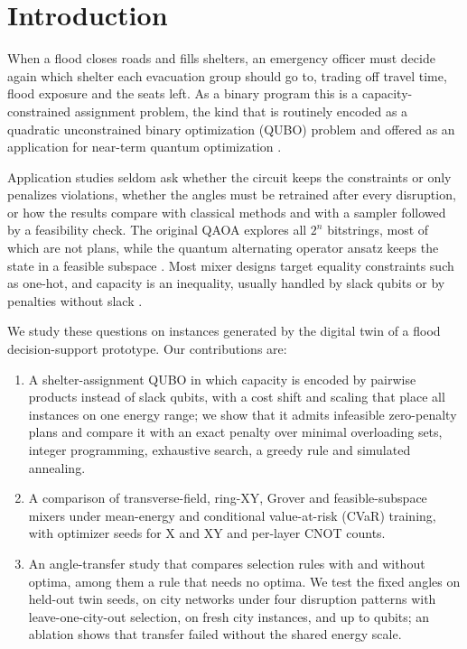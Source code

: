 \documentclass[conference]{IEEEtran}
\begin{document}
\section{Introduction}
When a flood closes roads and fills shelters, an emergency officer must decide again which shelter each evacuation group should go to, trading off travel time, flood exposure and the seats left. As a binary program this is a capacity-constrained assignment problem, the kind that is routinely encoded as a quadratic unconstrained binary optimization (QUBO) problem \cite{Lucas2014,Glover2019} and offered as an application for near-term quantum optimization \cite{Cadelina2024,Abbas2024}.

Application studies \cite{Cadelina2024,Abbas2024} seldom ask whether the circuit keeps the constraints or only penalizes violations, whether the angles must be retrained after every disruption, or how the results compare with classical methods and with a sampler followed by a feasibility check. The original QAOA \cite{Farhi2014} explores all $2^n$ bitstrings, most of which are not plans, while the quantum alternating operator ansatz \cite{Hadfield2019} keeps the state in a feasible subspace \cite{WangZ2020,Fuchs2022,Bartschi2020}. Most mixer designs target equality constraints such as one-hot, and capacity is an inequality, usually handled by slack qubits or by penalties without slack \cite{Montanez2024}.

We study these questions on instances generated by the digital twin of a flood decision-support prototype. Our contributions are:
\begin{enumerate}
\item A shelter-assignment QUBO in which capacity is encoded by pairwise products instead of slack qubits, with a cost shift and scaling that place all instances on one energy range; we show that it admits infeasible zero-penalty plans and compare it with an exact penalty over minimal overloading sets, integer programming, exhaustive search, a greedy rule and simulated annealing.
\item A comparison of transverse-field, ring-XY, Grover and feasible-subspace mixers under mean-energy and conditional value-at-risk (CVaR) training, with \NSeeds{} optimizer seeds for X and XY and per-layer CNOT counts.
\item An angle-transfer study that compares selection rules with and without optima, among them a rule that needs no optima. We test the fixed angles on held-out twin seeds, on city networks under four disruption patterns with leave-one-city-out selection, on fresh city instances, and up to \ScQubitsMax{} qubits; an ablation shows that transfer failed without the shared energy scale.
\end{enumerate}
\end{document}
